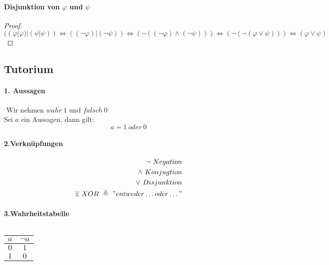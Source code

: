 \paragraph{Disjunktion von $\varphi$ und $\psi$}
\begin{proof}
\begin{equation*}
((\varphi|\varphi)|(\psi|\psi))\Leftrightarrow((\neg\varphi)|(\neg\psi))\Leftrightarrow(\neg((\neg\varphi)\wedge(\neg\psi)))\Leftrightarrow(\neg(\neg(\varphi\vee\psi)))\Leftrightarrow(\varphi\vee\psi)
\end{equation*}
\end{proof}

\newpage

\subsection{Tutorium}

\paragraph{1. Aussagen}
$ $\newline
Wir nehmen $wahr\ 1$ und $falsch\ 0$\\
Sei $a$ ein Aussagen, dann gilt:
\begin{equation*}
a=1\ oder\ 0
\end{equation*}

\paragraph{2.Verknüpfungen}
\begin{align*}
\neg\ Negation\\
\wedge\ Konjugtion\\
\vee\ Disjunktion\\
\veebar\ XOR\ \triangleq\ "entweder\ldots oder\ldots"
\end{align*}

\paragraph{3.Wahrheitstabelle}
\begin{exmp}
$ $\newline
\begin{center}
\begin{tabular}{|c||c|}
\hline
$a$ & $\neg a$ \\
\hline
$0$ & $1$ \\
$1$ & $0$ \\
\hline
\end{tabular}
\end{center}
\end{exmp}

